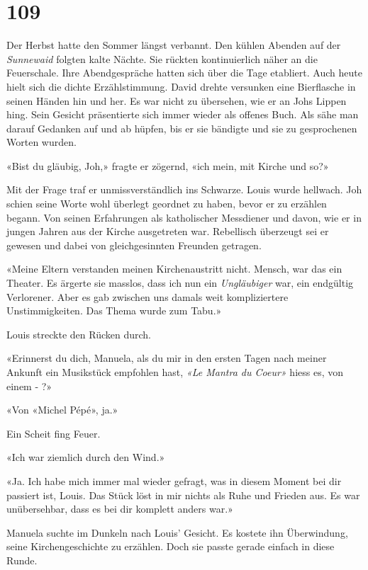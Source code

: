 \chapter{109}




Der Herbst hatte den Sommer längst verbannt. Den kühlen Abenden auf der \emph{Sunnewaid} folgten kalte Nächte.
Sie rückten kontinuierlich näher an die Feuerschale. Ihre Abendgespräche hatten sich über die Tage etabliert. Auch
heute hielt sich die dichte Erzählstimmung. 
David drehte versunken eine Bierflasche in seinen Händen hin und her. Es
war nicht zu übersehen, wie er an Johs Lippen hing. Sein Gesicht
präsentierte sich immer wieder als offenes Buch. Als sähe man darauf
Gedanken auf und ab hüpfen, bis er sie bändigte und sie zu gesprochenen
Worten wurden.

«Bist du gläubig, Joh,» fragte er zögernd, «ich mein, mit Kirche und
so?»

Mit der Frage traf er unmissverständlich ins Schwarze. Louis wurde
hellwach. Joh schien seine Worte wohl überlegt geordnet zu haben, bevor er zu erzählen begann. Von seinen Erfahrungen
als katholischer Messdiener und davon, wie er in jungen Jahren aus der
Kirche ausgetreten war. Rebellisch überzeugt sei er gewesen und dabei
von gleichgesinnten Freunden getragen.

«Meine Eltern verstanden meinen Kirchenaustritt nicht. Mensch, war das
ein Theater. Es ärgerte sie masslos, dass ich nun ein
\emph{Ungläubiger} war, ein endgültig Verlorener. Aber es gab zwischen
uns damals weit kompliziertere Unstimmigkeiten. Das Thema wurde zum Tabu.»

Louis streckte den Rücken durch.

«Erinnerst du dich, Manuela, als du mir in den ersten Tagen nach meiner
Ankunft ein Musikstück empfohlen hast, \emph{«Le Mantra du Coeur»}
hiess es, von einem - ?»

«Von «Michel Pépé», ja.»

Ein Scheit fing Feuer.

«Ich war ziemlich durch den Wind.»

«Ja. Ich habe mich immer mal wieder gefragt, was in diesem Moment bei
dir passiert ist, Louis. Das Stück löst in mir nichts als Ruhe und
Frieden aus. Es war unübersehbar, dass es bei dir komplett anders war.»

Manuela suchte im Dunkeln nach Louis’ Gesicht.
Es kostete ihn Überwindung, seine Kirchengeschichte zu erzählen. Doch sie
passte gerade einfach in diese Runde.

